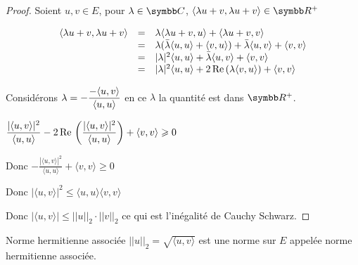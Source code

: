 \begin{proof}
    Soient $u, v \in E$, pour $\lambda \in \C$, $\langle\lambda u + v, \lambda u + v\rangle \in \R^+ $

    \[
    \begin{array}{rcl}
        \langle\lambda u + v, \lambda u + v\rangle & = & \lambda \langle\lambda u + v, u \rangle + \langle\lambda u + v, v\rangle \\
        \space & = & \lambda (\bar \lambda \langle u, u \rangle + \langle v, u \rangle ) + \bar \lambda \langle u, v \rangle + \langle v, v \rangle \\
        \space & = & |\lambda|^2 \langle u, u \rangle + \bar \lambda  \langle u, v \rangle + \langle v, v \rangle \\
        \space & = & |\lambda|^2 \langle u, u \rangle + 2 \operatorname{Re} \,(\lambda \langle v, u \rangle) + \langle v, v \rangle \\
    \end{array}
    \]

    Considérons $\displaystyle \lambda = - \frac{- \langle u, v \rangle }{\langle u, u \rangle}$ en ce $\lambda$ la quantité est dans
    $\R^+$.

    $\displaystyle \frac{|\langle u, v \rangle|^2}{\langle u, u \rangle} - 2 \operatorname{Re} \, \left(\frac{|\langle u, v \rangle|^2}{\langle u, u \rangle}\right) + \langle v, v \rangle \geqslant 0$

    Donc $\displaystyle - \frac{|\langle u, v \rangle|^2}{\langle u, u \rangle} + \langle v, v \rangle \geqslant 0$

    Donc $|\langle u, v \rangle|^2 \leqslant \langle u, u \rangle \langle v, v \rangle$

    Donc $|\langle u, v \rangle| \leqslant ||u||_2 \cdot ||v||_2$ ce qui est l'inégalité de Cauchy Schwarz. 
\end{proof}

\begin{theoreme}{Norme hermitienne associée}{}
    $||u||_2 = \sqrt{\langle u, v \rangle}$ est une norme sur $E$ appelée norme hermitienne associée. 
\end{theoreme}


